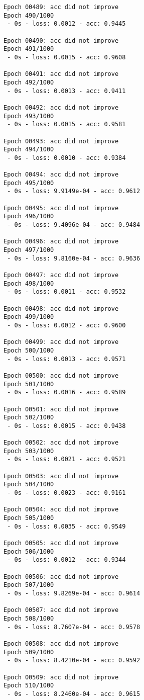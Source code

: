 \documentclass[11pt]{article}
\begin{document}
\begin{Verbatim}[commandchars=\\\{\}]
Epoch 00489: acc did not improve
Epoch 490/1000
 - 0s - loss: 0.0012 - acc: 0.9445

Epoch 00490: acc did not improve
Epoch 491/1000
 - 0s - loss: 0.0015 - acc: 0.9608

Epoch 00491: acc did not improve
Epoch 492/1000
 - 0s - loss: 0.0013 - acc: 0.9411

Epoch 00492: acc did not improve
Epoch 493/1000
 - 0s - loss: 0.0015 - acc: 0.9581

Epoch 00493: acc did not improve
Epoch 494/1000
 - 0s - loss: 0.0010 - acc: 0.9384

Epoch 00494: acc did not improve
Epoch 495/1000
 - 0s - loss: 9.9149e-04 - acc: 0.9612

Epoch 00495: acc did not improve
Epoch 496/1000
 - 0s - loss: 9.4096e-04 - acc: 0.9484

Epoch 00496: acc did not improve
Epoch 497/1000
 - 0s - loss: 9.8160e-04 - acc: 0.9636

Epoch 00497: acc did not improve
Epoch 498/1000
 - 0s - loss: 0.0011 - acc: 0.9532

Epoch 00498: acc did not improve
Epoch 499/1000
 - 0s - loss: 0.0012 - acc: 0.9600

Epoch 00499: acc did not improve
Epoch 500/1000
 - 0s - loss: 0.0013 - acc: 0.9571

Epoch 00500: acc did not improve
Epoch 501/1000
 - 0s - loss: 0.0016 - acc: 0.9589

Epoch 00501: acc did not improve
Epoch 502/1000
 - 0s - loss: 0.0015 - acc: 0.9438

Epoch 00502: acc did not improve
Epoch 503/1000
 - 0s - loss: 0.0021 - acc: 0.9521

Epoch 00503: acc did not improve
Epoch 504/1000
 - 0s - loss: 0.0023 - acc: 0.9161

Epoch 00504: acc did not improve
Epoch 505/1000
 - 0s - loss: 0.0035 - acc: 0.9549

Epoch 00505: acc did not improve
Epoch 506/1000
 - 0s - loss: 0.0012 - acc: 0.9344

Epoch 00506: acc did not improve
Epoch 507/1000
 - 0s - loss: 9.8269e-04 - acc: 0.9614

Epoch 00507: acc did not improve
Epoch 508/1000
 - 0s - loss: 8.7607e-04 - acc: 0.9578

Epoch 00508: acc did not improve
Epoch 509/1000
 - 0s - loss: 8.4210e-04 - acc: 0.9592

Epoch 00509: acc did not improve
Epoch 510/1000
 - 0s - loss: 8.2460e-04 - acc: 0.9615


\end{Verbatim}
\end{document}

